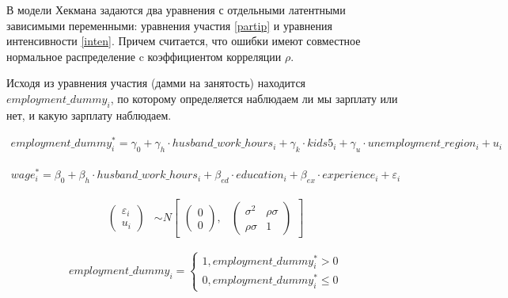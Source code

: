 \documentclass[a4paper,12pt]{article}
\begin{document}
\vspace{0.2cm}

В модели Хекмана задаются два уравнения с отдельными латентными зависимыми переменными: уравнения участия \ref{partip} и уравнения интенсивности \ref{inten}. Причем считается, что ошибки имеют совместное нормальное распределение c коэффициентом корреляции $\rho$.

Исходя из уравнения участия (дамми на занятость) находится $employment\_dummy_i$, по которому определяется наблюдаем ли мы зарплату или нет, и какую зарплату наблюдаем. 


\begin{equation}\label{partip}
	\begin{aligned}
			employment\_dummy_i^* =\gamma_0+ \gamma_h \cdot husband\_work\_hours_i + \gamma_k \cdot kids5_i +  \gamma_u \cdot unemployment\_region_i + u_i
	\end{aligned}
\end{equation}

\begin{equation}\label{inten}
	\begin{aligned}
			wage_i^* =\beta_0+ \beta_h \cdot husband\_work\_hours_i  +\beta_{ed} \cdot education_i + \beta_{ex} \cdot experience_i + \varepsilon_i
	\end{aligned}
\end{equation}

\begin{align*}
	\begin{pmatrix}
		\varepsilon_i\\
		u_i
	\end{pmatrix} &\sim  N
	\begin{bmatrix}
		\begin{pmatrix}
			0\\
			0
		\end{pmatrix}\!,&
		\begin{pmatrix}
			\sigma^2 & \rho \sigma  \\
			\rho \sigma & 1 
		\end{pmatrix}
	\end{bmatrix}
\end{align*}



\begin{equation*}
employment\_dummy_i= 
	\begin{cases}
		1, employment\_dummy_i^*  >  0 \\
		0, employment\_dummy_i^*  \leq 0
	\end{cases}
\end{equation*}
\end{document}
